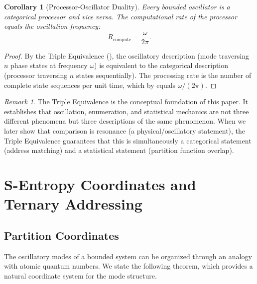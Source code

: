 \documentclass[11pt,twocolumn,a4paper]{article}
\newtheorem{corollary}[theorem]{Corollary}
\theoremstyle{definition}
\theoremstyle{remark}
\newtheorem{remark}[theorem]{Remark}
\begin{document}
\begin{corollary}[Processor-Oscillator Duality]\label{cor:processor-oscillator}
Every bounded oscillator is a categorical processor and vice versa. The computational rate of the processor equals the oscillation frequency:
\begin{equation}\label{eq:processor-oscillator}
  R_{\mathrm{compute}} = \frac{\omega}{2\pi}.
\end{equation}
\end{corollary}

\begin{proof}
By the Triple Equivalence (), the oscillatory description (mode traversing $n$ phase states at frequency $\omega$) is equivalent to the categorical description (processor traversing $n$ states sequentially). The processing rate is the number of complete state sequences per unit time, which by  equals $\omega/(2\pi)$.
\end{proof}

\begin{remark}\label{rem:triple-significance}
The Triple Equivalence is the conceptual foundation of this paper. It establishes that oscillation, enumeration, and statistical mechanics are not three different phenomena but three descriptions of the same phenomenon. When we later show that comparison is resonance (a physical/oscillatory statement), the Triple Equivalence guarantees that this is simultaneously a categorical statement (address matching) and a statistical statement (partition function overlap).
\end{remark}

\section{S-Entropy Coordinates and Ternary Addressing}\label{sec:ternary}

\subsection{Partition Coordinates}\label{sec:partition-coords}

The oscillatory modes of a bounded system can be organized through an analogy with atomic quantum numbers. We state the following theorem, which provides a natural coordinate system for the mode structure.
\end{document}
